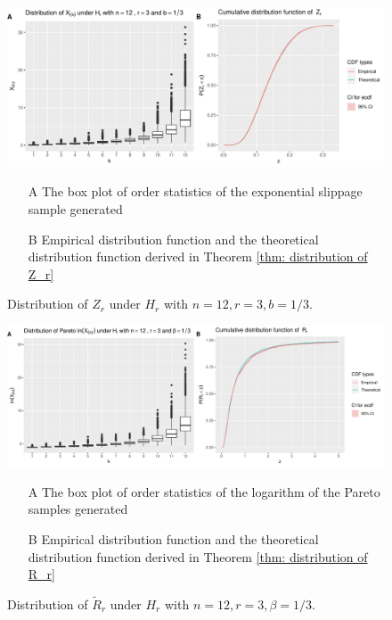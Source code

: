 \documentclass{report}
\begin{document}
\begin{figure}[hbtp]
    \centering
    \includegraphics[scale = 0.6]{plot_1.pdf}
    \caption{Distribution of $Z_r$ under $H_r$ with $n =12, r =3, b = 1/3$.}
    {\label{Figure: cdf of Zr}
        \par {\small \begin{itemize}
            \item[A] The box plot of order statistics of the exponential slippage sample generated \\
            \item[B] Empirical distribution function and the theoretical distribution function derived in Theorem \ref{thm: distribution of Z_r}
        \end{itemize}
    }}
\end{figure}

\begin{figure}[hbtp]
    \centering
    \includegraphics[scale = 0.6]{plot_2.pdf}
    \caption{Distribution of $\tilde R_r$ under $H_r$ with $n =12, r =3, \beta = 1/3$.}
    {\label{Figure: cdf of Rk}
        \par {\small
        \begin{itemize}
            \item[A] The box plot of order statistics of the logarithm of the Pareto samples generated \\
            \item[B] Empirical distribution function and the theoretical distribution function derived in Theorem \ref{thm: distribution of R_r}
        \end{itemize}
    }}
\end{figure}
\end{document}
